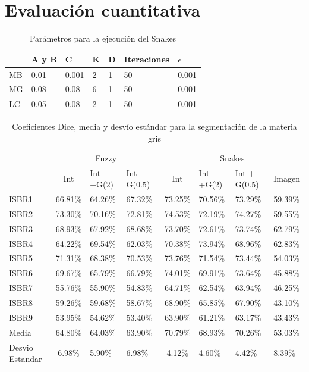 \section{Evaluación cuantitativa}

\begin{table}[h]
	\centering
	\begin{tabular}{l|llllll}
		& A y B & C & K & D & Iteraciones & $\epsilon$ \\ \hline
		MB & 0.01 & 0.001 & 2 & 1 & 50 & 0.001 \\
		MG & 0.08 & 0.08 & 6 & 1 & 50 & 0.001 \\
		LC & 0.05 & 0.08 & 2 & 1 & 50 & 0.001
	\end{tabular}
	\caption{Parámetros para la ejecución del Snakes}
	\label{table:parametros_snakes}
\end{table}

\begin{table}[h]
		\centering
	\begin{tabular}{l|cll|clll}
		& \multicolumn{3}{c|}{Fuzzy} & \multicolumn{4}{c}{Snakes} \\ \cline{2-8} 
		& Int & Int +G($2$) & Int + G($0.5$) & Int & Int +G($2$) & Int + G($0.5$) & Imagen \\ \hline
		ISBR1 & 66.81\% & 64.26\% & 67.32\% & 73.25\% & 70.56\% & 73.29\% & 59.39\% \\
		ISBR2 & 73.30\% & 70.16\% & 72.81\% & 74.53\% & 72.19\% & 74.27\% & 59.55\% \\
		ISBR3 & 68.93\% & 67.92\% & 68.68\% & 73.70\% & 72.61\% & 73.74\% & 62.79\% \\
		ISBR4 & 64.22\% & 69.54\% & 62.03\% & 70.38\% & 73.94\% & 68.96\% & 62.83\% \\
		ISBR5 & 71.31\% & 68.38\% & 70.53\% & 73.76\% & 71.54\% & 73.44\% & 54.03\% \\
		ISBR6 & 69.67\% & 65.79\% & 66.79\% & 74.01\% & 69.91\% & 73.64\% & 45.88\% \\
		ISBR7 & 55.76\% & 55.90\% & 54.83\% & 64.71\% & 62.54\% & 63.94\% & 46.25\% \\
		ISBR8 & 59.26\% & 59.68\% & 58.67\% & 68.90\% & 65.85\% & 67.90\% & 43.10\% \\
		ISBR9 & 53.95\% & 54.62\% & 53.40\% & 63.90\% & 61.21\% & 63.17\% & 43.43\% \\ \hline
		Media & 64.80\% & 64.03\% & 63.90\% & 70.79\% & 68.93\% & 70.26\% & 53.03\% \\ \hline
		Desvio Estandar & 6.98\% & 5.90\% & 6.98\% & 4.12\% & 4.60\% & 4.42\% & 8.39\%
	\end{tabular}
	\caption{Coeficientes Dice, media y desvío estándar para la segmentación de la materia gris}
	\label{table:resultados_gris}
\end{table}

